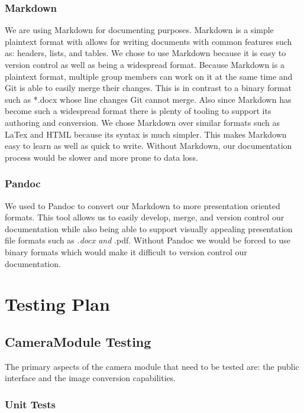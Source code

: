 \documentclass[12pt]{article}
\begin{document}
\subsubsection{Markdown}\label{markdown}

We are using Markdown for documenting purposes. Markdown is a simple
plaintext format with allows for writing documents with common features
such as: headers, lists, and tables. We chose to use Markdown because it
is easy to version control as well as being a widespread format. Because
Markdown is a plaintext format, multiple group members can work on it at
the same time and Git is able to easily merge their changes. This is in
contrast to a binary format such as *.docx whose line changes Git cannot
merge. Also since Markdown has become such a widespread format there is
plenty of tooling to support its authoring and conversion. We chose
Markdown over similar formats such as LaTex and HTML because its syntax
is much simpler. This makes Markdown easy to learn as well as quick to
write. Without Markdown, our documentation process would be slower and
more prone to data loss.

\subsubsection{Pandoc}\label{pandoc}

We used to Pandoc to convert our Markdown to more presentation oriented
formats. This tool allows us to easily develop, merge, and version
control our documentation while also being able to support visually
appealing presentation file formats such as \emph{.docx and }.pdf.
Without Pandoc we would be forced to use binary formats which would make
it difficult to version control our documentation.

\section{Testing Plan}\label{testing-plan}

\subsection{CameraModule Testing}\label{cameramodule-testing}

The primary aspects of the camera module that need to be tested are: the
public interface and the image conversion capabilities.

\subsubsection{Unit Tests}\label{unit-tests}
\end{document}
